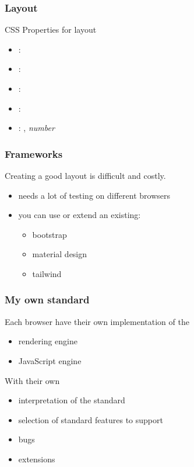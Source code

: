 \begin{frame}[fragile]
\frametitle{Layout}
\color{structure}
CSS Properties for layout
\begin{itemize}
  \item {}: 
  \item {}: 
  \item {}: 
  \item {}: 
  \item {}: , \it{number}
\end{itemize}
\end{frame}

\begin{frame}[fragile]
\frametitle{Frameworks}
\color{structure}
Creating a good layout is difficult and costly. 
\begin{itemize}\color{structure}
  \item needs a lot of testing on different browsers
  \item you can use or extend an existing:
  \begin{itemize}
    \item bootstrap
    \item material design
    \item tailwind
  \end{itemize}
\end{itemize}
\end{frame}

\begin{frame}[fragile]
\frametitle{My own standard}
\color{structure}
Each browser have their own implementation of the
\begin{itemize}\color{structure}
  \item rendering engine
  \item JavaScript engine
\end{itemize}
\vspace{5mm}
With their own
\begin{itemize}\color{structure}
  \item interpretation of the standard
  \item selection of standard features to support
  \item bugs
  \item extensions
\end{itemize}
\end{frame}


